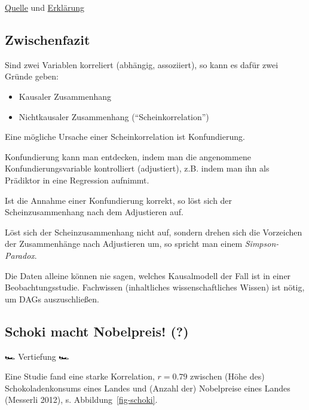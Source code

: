 \documentclass[
  a4paper,
  DIV=11]{scrreprt}
\providecommand{\tightlist}{%
  \setlength{\itemsep}{0pt}\setlength{\parskip}{0pt}}\usepackage{longtable,booktabs,array}
\theoremstyle{definition}
\theoremstyle{remark}
\begin{document}
\href{https://xkcd.com/552/}{Quelle} und
\href{https://www.explainxkcd.com/wiki/index.php/552:_Correlation}{Erklärung}

\hypertarget{zwischenfazit-1}{%
\subsection{Zwischenfazit}\label{zwischenfazit-1}}

Sind zwei Variablen korreliert (abhängig, assoziiert), so kann es dafür
zwei Gründe geben:

\begin{itemize}
\tightlist
\item
  Kausaler Zusammenhang
\item
  Nichtkausaler Zusammenhang (``Scheinkorrelation'')
\end{itemize}

Eine mögliche Ursache einer Scheinkorrelation ist Konfundierung.

Konfundierung kann man entdecken, indem man die angenommene
Konfundierungsvariable kontrolliert (adjustiert), z.B. indem man ihn als
Prädiktor in eine Regression aufnimmt.

Ist die Annahme einer Konfundierung korrekt, so löst sich der
Scheinzusammenhang nach dem Adjustieren auf.

Löst sich der Scheinzusammenhang nicht auf, sondern drehen sich die
Vorzeichen der Zusammenhänge nach Adjustieren um, so spricht man einem
\emph{Simpson-Paradox}.

Die Daten alleine können nie sagen, welches Kausalmodell der Fall ist in
einer Beobachtungsstudie. Fachwissen (inhaltliches wissenschaftliches
Wissen) ist nötig, um DAGs auszuschließen.

\hypertarget{schoki-macht-nobelpreis}{%
\subsection{Schoki macht Nobelpreis!
(?)}\label{schoki-macht-nobelpreis}}

🏎️ Vertiefung 🏎️

Eine Studie fand eine starke Korrelation, \(r=0.79\) zwischen (Höhe des)
Schokoladenkonsums eines Landes und (Anzahl der) Nobelpreise eines
Landes (Messerli 2012), s. Abbildung~\ref{fig-schoki}.
\end{document}
